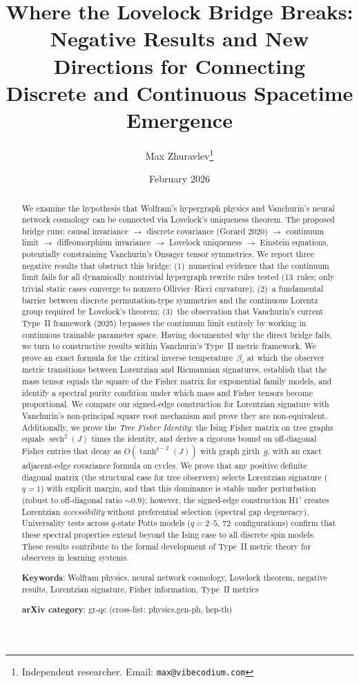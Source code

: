 \documentclass[11pt]{article}
\title{Where the Lovelock Bridge Breaks:\\
Negative Results and New Directions for Connecting\\
Discrete and Continuous Spacetime Emergence}
\author{Max Zhuravlev\thanks{Independent researcher. Email: \texttt{max@vibecodium.com}}}
\date{February 2026}
\theoremstyle{definition}
\theoremstyle{remark}
\begin{document}
\maketitle

\begin{abstract}
We examine the hypothesis that Wolfram's hypergraph physics and Vanchurin's
neural network cosmology can be connected via Lovelock's uniqueness theorem.
The proposed bridge runs: causal invariance $\to$ discrete covariance (Gorard 2020)
$\to$ continuum limit $\to$ diffeomorphism invariance $\to$ Lovelock uniqueness $\to$
Einstein equations, potentially constraining Vanchurin's Onsager tensor symmetries.
We report three negative results that obstruct this bridge:
(1)~numerical evidence that the continuum limit fails for all dynamically
nontrivial hypergraph rewrite rules tested (13~rules; only trivial static
cases converge to nonzero Ollivier--Ricci curvature);
(2)~a fundamental barrier between discrete permutation-type symmetries and the
continuous Lorentz group required by Lovelock's theorem;
(3)~the observation that Vanchurin's current Type~II framework (2025)
bypasses the continuum limit entirely by working in continuous trainable
parameter space.
Having documented why the direct bridge fails, we turn to constructive results
within Vanchurin's Type~II metric framework.
We prove an exact formula for the critical inverse temperature~$\beta_c$ at
which the observer metric transitions between Lorentzian and Riemannian
signatures, establish that the mass tensor equals the square of the Fisher
matrix for exponential family models, and identify a spectral purity condition
under which mass and Fisher tensors become proportional.
We compare our signed-edge construction for Lorentzian signature with
Vanchurin's non-principal square root mechanism and prove they are
non-equivalent.
Additionally, we prove the \emph{Tree Fisher Identity}: the Ising Fisher
matrix on tree graphs equals $\operatorname{sech}^2(J)$ times the identity,
and derive a rigorous bound on off-diagonal Fisher entries that decay as
$O(\tanh^{g-2}(J))$ with graph girth~$g$, with an exact adjacent-edge
covariance formula on cycles.
We prove that any positive definite diagonal matrix (the structural
case for tree observers) selects Lorentzian signature ($q = 1$) with
explicit margin, and that this dominance is stable under perturbation
(robust to off-diagonal ratio ${\sim}0.9$); however, the signed-edge
construction H1$'$ creates Lorentzian \emph{accessibility} without
preferential selection (spectral gap degeneracy).
Universality tests across $q$-state Potts models ($q = 2$--$5$,
72~configurations) confirm that these spectral properties extend beyond
the Ising case to all discrete spin models.
These results contribute to the formal development of Type~II metric theory
for observers in learning systems.

\medskip
\noindent\textbf{Keywords}: Wolfram physics, neural network cosmology,
Lovelock theorem, negative results, Lorentzian signature, Fisher information,
Type~II metrics

\medskip
\noindent\textbf{arXiv category}: gr-qc (cross-list: physics.gen-ph, hep-th)
\end{abstract}
\end{document}
